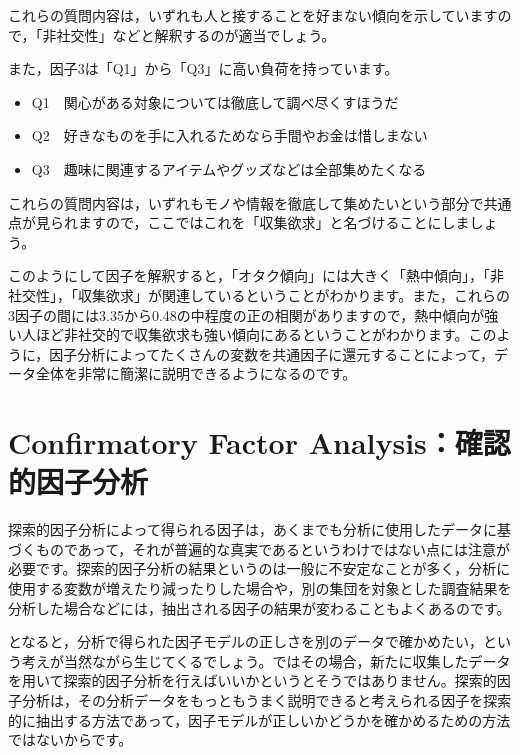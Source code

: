 \documentclass[
  12pt,
  a5jpaper,
  lualatex, ja=standard]{bxjsbook}
\providecommand{\tightlist}{%
  \setlength{\itemsep}{0pt}\setlength{\parskip}{0pt}}
\newenvironment{jmvorange}{%
	\begin{center}%
	\begin{tcolorbox}[%
		colframe=daidai,
		colbacktitle=daidai!30!white,
		coltitle=daidai!10!black,
		colback=daidai!2!white,
		breakable,
		width=.9\textwidth
		]\small\addtolength{\leftmargini}{-3\labelsep}%
	}%
	{\end{tcolorbox}\end{center}}
\begin{document}
これらの質問内容は，いずれも人と接することを好まない傾向を示していますので，「非社交性」などと解釈するのが適当でしょう。

また，因子3は「Q1」から「Q3」に高い負荷を持っています。

\begin{jmvorange}

\begin{itemize}
\tightlist
\item
  Q1　関心がある対象については徹底して調べ尽くすほうだ
\item
  Q2　好きなものを手に入れるためなら手間やお金は惜しまない
\item
  Q3　趣味に関連するアイテムやグッズなどは全部集めたくなる
\end{itemize}

\end{jmvorange}

これらの質問内容は，いずれもモノや情報を徹底して集めたいという部分で共通点が見られますので，ここではこれを「収集欲求」と名づけることにしましょう。

このようにして因子を解釈すると，「オタク傾向」には大きく「熱中傾向」，「非社交性」，「収集欲求」が関連しているということがわかります。また，これらの3因子の間には3.35から0.48の中程度の正の相関がありますので，熱中傾向が強い人ほど非社交的で収集欲求も強い傾向にあるということがわかります。このように，因子分析によってたくさんの変数を共通因子に還元することによって，データ全体を非常に簡潔に説明できるようになるのです。

\hypertarget{sec:factor-cfa}{%
\section{Confirmatory Factor Analysis：確認的因子分析}\label{sec:factor-cfa}}

探索的因子分析によって得られる因子は，あくまでも分析に使用したデータに基づくものであって，それが普遍的な真実であるというわけではない点には注意が必要です。探索的因子分析の結果というのは一般に不安定なことが多く，分析に使用する変数が増えたり減ったりした場合や，別の集団を対象とした調査結果を分析した場合などには，抽出される因子の結果が変わることもよくあるのです。

となると，分析で得られた因子モデルの正しさを別のデータで確かめたい，という考えが当然ながら生じてくるでしょう。ではその場合，新たに収集したデータを用いて探索的因子分析を行えばいいかというとそうではありません。探索的因子分析は，その分析データをもっともうまく説明できると考えられる因子を探索的に抽出する方法であって，因子モデルが正しいかどうかを確かめるための方法ではないからです。
\end{document}
